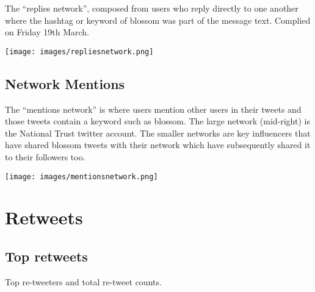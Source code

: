\documentclass[
]{article}
\begin{document}
The ``replies network'', composed from users who reply directly to one
another where the hashtag or keyword of blossom was part of the message
text. Complied on Friday 19th March.

\texttt{[image: images/repliesnetwork.png]}

\hypertarget{network-mentions}{%
\subsection{Network Mentions}\label{network-mentions}}

The ``mentions network'' is where users mention other users in their
tweets and those tweets contain a keyword such as blossom. The large
network (mid-right) is the National Trust twitter account. The smaller
networks are key influencers that have shared blossom tweets with their
network which have subsequently shared it to their followers too.

\texttt{[image: images/mentionsnetwork.png]}

\hypertarget{retweets}{%
\section{Retweets}\label{retweets}}

\hypertarget{top-retweets}{%
\subsection{Top retweets}\label{top-retweets}}

Top re-tweeters and total re-tweet counts.
\end{document}
